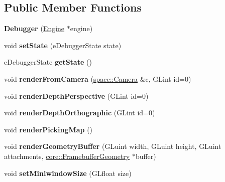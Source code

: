 \subsection*{Public Member Functions}
\begin{DoxyCompactItemize}
\item 
\hypertarget{classfillwave_1_1Debugger_a916a59a8b573be238f26626a3dd3e0df}{}{\bfseries Debugger} (\hyperlink{classfillwave_1_1Engine}{Engine} $\ast$engine)\label{classfillwave_1_1Debugger_a916a59a8b573be238f26626a3dd3e0df}

\item 
\hypertarget{classfillwave_1_1Debugger_a620466ef93072fac97c956293b038fb5}{}void {\bfseries set\+State} (e\+Debugger\+State state)\label{classfillwave_1_1Debugger_a620466ef93072fac97c956293b038fb5}

\item 
\hypertarget{classfillwave_1_1Debugger_a25d9c255d84370933da398a8cb38fce2}{}e\+Debugger\+State {\bfseries get\+State} ()\label{classfillwave_1_1Debugger_a25d9c255d84370933da398a8cb38fce2}

\item 
\hypertarget{classfillwave_1_1Debugger_af619acbc915ad80bd3a8258edcfe754a}{}void {\bfseries render\+From\+Camera} (\hyperlink{classfillwave_1_1space_1_1Camera}{space\+::\+Camera} \&c, G\+Lint id=0)\label{classfillwave_1_1Debugger_af619acbc915ad80bd3a8258edcfe754a}

\item 
\hypertarget{classfillwave_1_1Debugger_a34c732a8dea6cfbd9506562f1ef6ee3e}{}void {\bfseries render\+Depth\+Perspective} (G\+Lint id=0)\label{classfillwave_1_1Debugger_a34c732a8dea6cfbd9506562f1ef6ee3e}

\item 
\hypertarget{classfillwave_1_1Debugger_a851369b872939bcd46535e7e0f139d7d}{}void {\bfseries render\+Depth\+Orthographic} (G\+Lint id=0)\label{classfillwave_1_1Debugger_a851369b872939bcd46535e7e0f139d7d}

\item 
\hypertarget{classfillwave_1_1Debugger_a30003a3318a2e7a8921da86f7ce70b46}{}void {\bfseries render\+Picking\+Map} ()\label{classfillwave_1_1Debugger_a30003a3318a2e7a8921da86f7ce70b46}

\item 
\hypertarget{classfillwave_1_1Debugger_a9c7049d492d44854dd68f1a11bc64eae}{}void {\bfseries render\+Geometry\+Buffer} (G\+Luint width, G\+Luint height, G\+Luint attachments, \hyperlink{classfillwave_1_1core_1_1FramebufferGeometry}{core\+::\+Framebuffer\+Geometry} $\ast$buffer)\label{classfillwave_1_1Debugger_a9c7049d492d44854dd68f1a11bc64eae}

\item 
\hypertarget{classfillwave_1_1Debugger_af0dba84ff97208f17efa4a3e74d23b31}{}void {\bfseries set\+Miniwindow\+Size} (G\+Lfloat size)\label{classfillwave_1_1Debugger_af0dba84ff97208f17efa4a3e74d23b31}

\end{DoxyCompactItemize}
